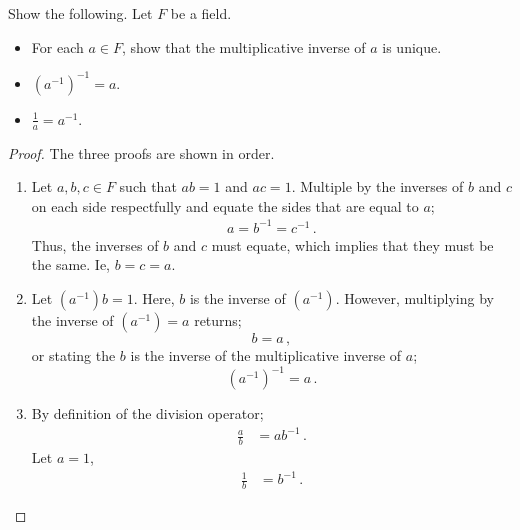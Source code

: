 \fullpageboxline
\begin{problem}
    Show the following. Let $F$ be a field.
    \begin{itemize}
        \item For each $a \in F$, show that the multiplicative inverse of $a$ is unique.
        \item $(a^{-1})^{-1} = a$.
        \item $\frac{1}{a} = a^{-1}$.
    \end{itemize}
\end{problem}
\begin{proof}
    The three proofs are shown in order.
    \begin{enumerate}
        \item Let $a,b,c \in F$ such that $ab = 1$ and $ac = 1$. Multiple by the inverses of $b$ and $c$ on each side respectfully and equate the sides that are equal to $a$;
        \begin{align*}
            a = b^{-1} = c^{-1}\,.
        \end{align*}
        Thus, the inverses of $b$ and $c$ must equate, which implies that they must be the same. Ie, $b = c = a$.
        \item Let $(a^{-1})b = 1$. Here, $b$ is the inverse of $(a^{-1})$. However, multiplying by the inverse of $(a^{-1}) = a$ returns;
        \begin{equation*}
            b = a\,,
        \end{equation*}
        or stating the $b$ is the inverse of the multiplicative inverse of $a$;
        \begin{equation*}
            (a^{-1})^{-1} = a\,.
        \end{equation*}
        \item By definition of the division operator;
        \begin{align*}
            \frac{a}{b} &= a b^{-1}\,.
        \end{align*}
            Let $a=1$,
        \begin{align*}    
            \frac{1}{b} &= b^{-1}\,.
        \end{align*}
    \end{enumerate}
\end{proof}

